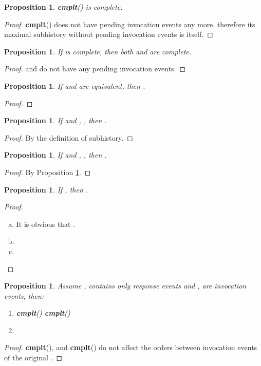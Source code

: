 \documentclass[a4paper,USenglish]{lipics-v2016}
\newtheorem{prop}[theorem]{Proposition}
\newcommand{\cmplt}{\textbf{cmplt}}
\newcommand{\his}{\text{H}}
\begin{document}
\begin{prop}\label{lem_chis_1}
	\cmplt({\his}) is complete.
\end{prop}
\begin{proof}
	\cmplt({\his}) does not have pending invocation events any more, therefore its maximal subhistory without pending invocation events is itself.
\end{proof}

\begin{prop}\label{lem_chis_2}
	If {\his} is complete, then both  and  are complete.
\end{prop}
\begin{proof}
	 and  do not have any pending invocation events.
\end{proof}

\begin{prop}\label{lem_his_eqiv}
	If  and  are equivalent, then .
\end{prop}
\begin{proof}
	
\end{proof}

\begin{prop}\label{lem_subhis_el}
	If  and , ,
	then .
\end{prop}
\begin{proof}
	By the definition of subhistory.
\end{proof}

\begin{prop}\label{lem_subhis_ml}
	If  and , ,
	then .
\end{prop}
\begin{proof}
	By Proposition \ref{lem_subhis_el}.
\end{proof}

\begin{prop}\label{lem_diffhis_oeq}
	If , then .
\end{prop}
\begin{proof}
	\begin{enumerate}[(a)]
		\item
		It is obvious that .
		
		\item
		
		
		\item
			
	\end{enumerate}
\end{proof}

\begin{prop}\label{lem_inv}
	Assume ,  contains only response events and ,  are invocation events, then:
	\begin{enumerate}[(1)]
		\item
		 \cmplt({\his})  \cmplt()
		\item
		
	\end{enumerate}
\end{prop}
\begin{proof}
	\cmplt({\his}),  and \cmplt() do not affect the orders between invocation events of the original {\his}.
\end{proof}
\end{document}
